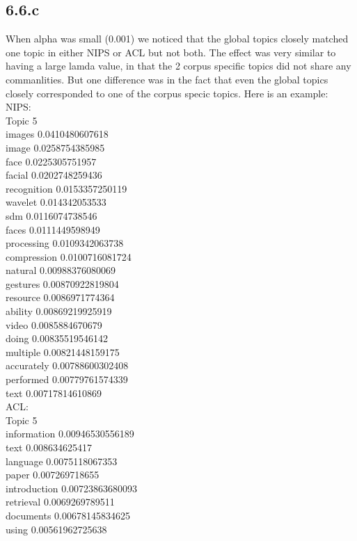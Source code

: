 \documentclass{article}
\begin{document}
{\subsection*{6.6.c}
When alpha was small (0.001) we noticed that the global topics closely matched one topic in either NIPS or ACL but not both.
The effect was very similar to having a large lamda value, in that the 2 corpus specific topics did not share any commanlities. But one difference was in the fact that even the global topics closely corresponded to one of the corpus specic topics. Here is an example:
NIPS:\\
Topic 5\\
images 0.0410480607618\\
image 0.0258754385985\\
face 0.0225305751957\\
facial 0.0202748259436\\
recognition 0.0153357250119\\
wavelet 0.014342053533\\
sdm 0.0116074738546\\
faces 0.0111449598949\\
processing 0.0109342063738\\
compression 0.0100716081724\\
natural 0.00988376080069\\
gestures 0.00870922819804\\
resource 0.0086971774364\\
ability 0.00869219925919\\
video 0.0085884670679\\
doing 0.00835519546142\\
multiple 0.00821448159175\\
accurately 0.00788600302408\\
performed 0.00779761574339\\
text 0.00717814610869\\
ACL:\\
Topic 5\\
information 0.00946530556189\\
text 0.008634625417\\
language 0.0075118067353\\
paper 0.007269718655\\
introduction 0.00723863680093\\
retrieval 0.0069269789511\\
documents 0.00678145834625\\
using 0.00561962725638\\
}
\end{document}
